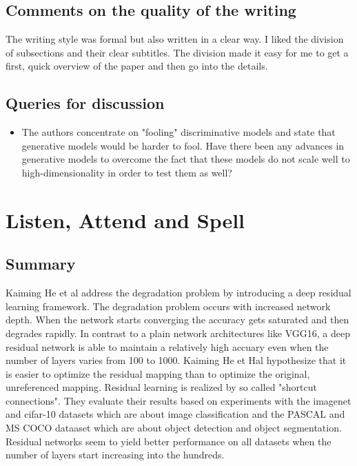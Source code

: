 \documentclass[a4paper]{article}
\begin{document}
\subsection{Comments on the quality of the writing}

The writing style was formal but also written in a clear way. I liked the division of subsections and their clear subtitles. The division made it easy for me to get a first, quick overview of the paper and then go into the details.

\subsection{Queries for discussion}

\begin{itemize}
	\item The authors concentrate on "fooling" discriminative models and state that generative models would be harder to fool. Have there been any advances in generative models to overcome the fact that these models do not scale well to high-dimensionality in order to test them as well?
\end{itemize}


\section{Listen, Attend and Spell}

\subsection{Summary}

Kaiming He et al address the degradation problem by introducing a deep residual learning framework. The degradation problem occurs with increased network depth. When the network starts converging the accuracy gets saturated and then degrades rapidly. In contrast to a plain network architectures like VGG16, a deep residual network is able to maintain a relatively high accuary even when the number of layers varies from 100 to 1000. Kaiming He et Hal hypothesize that it is easier to optimize the residual mapping than to optimize the original, unreferenced mapping. Residual learning is realized by so called "shortcut connections". They evaluate their results based on experiments with the imagenet and cifar-10 datasets which are about image classification and the PASCAL and MS COCO dataaset which are about object detection and object segmentation. Residual networks seem to yield better performance on all datasets when the number of layers start increasing into the hundreds.
\end{document}
